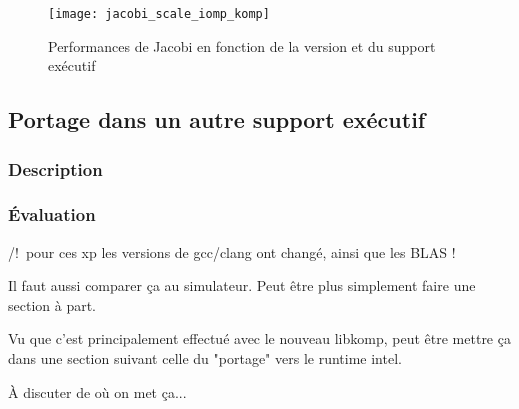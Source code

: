\begin{figure}[ht]
  \centering
  \texttt{[image: jacobi\_scale\_iomp\_komp]}
  \caption{Performances de Jacobi en fonction de la version et du support exécutif}\label{fig:contribs:perf_eval:eval-jacobi}
\end{figure}

\subsection{Portage dans un autre support exécutif}\label{sec:contribs:perf_eval:libkomp}

\subsubsection{Description}

\subsubsection{Évaluation}

/!\ pour ces xp les versions de gcc/clang ont changé, ainsi que les BLAS !

\begin{todo}
  Il faut aussi comparer ça au simulateur. Peut être plus simplement faire une section à part.

  Vu que c'est principalement effectué avec le nouveau libkomp, peut être mettre ça dans une section suivant celle du "portage" vers le runtime intel.

  À discuter de où on met ça...
\end{todo}


